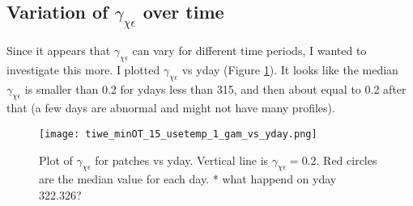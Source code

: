 \documentclass[11pt]{article}
\begin{document}







\clearpage
\subsection{Variation of $\gamma_{\chi\epsilon}$ over time}

Since it appears that $\gamma_{\chi\epsilon}$ can vary for different time periods, I wanted to investigate this more. I plotted $\gamma_{\chi\epsilon}$ vs yday (Figure \ref{gamvsyday}). It looks like the median $\gamma_{\chi\epsilon}$ is smaller than 0.2 for ydays less than 315, and then about equal to 0.2 after that (a few days are abnormal and might not have many profiles).

\begin{figure}[htbp]
\texttt{[image: tiwe\_minOT\_15\_usetemp\_1\_gam\_vs\_yday.png]}
\caption{Plot of $\gamma_{\chi\epsilon}$ for patches vs yday. Vertical line is $\gamma_{\chi\epsilon}=0.2$. Red circles are the median value for each day. * what happend on yday 322.326?}
\label{gamvsyday}
\end{figure}





\end{document}
